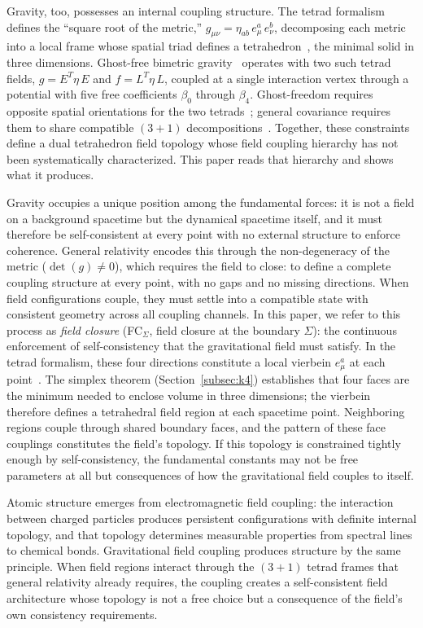 \documentclass[aps,prd,preprint,superscriptaddress,showpacs,preprintnumbers,amsmath,amssymb,nofootinbib]{revtex4-2}
\begin{document}
Gravity, too, possesses an internal coupling structure. The tetrad formalism~\cite{mtw1973,wald1984} defines the ``square root of the metric,'' $g_{\mu\nu} = \eta_{ab}\,e^a_\mu\,e^b_\nu$, decomposing each metric into a local frame whose spatial triad defines a tetrahedron~\cite{barbieri1998}, the minimal solid in three dimensions. Ghost-free bimetric gravity~\cite{hassan2012,hinterbichler2012} operates with two such tetrad fields, $g = E^T\eta\,E$ and $f = L^T\eta\,L$, coupled at a single interaction vertex through a potential with five free coefficients $\beta_0$ through $\beta_4$. Ghost-freedom requires opposite spatial orientations for the two tetrads~\cite{alexander2014}; general covariance requires them to share compatible $(3{+}1)$ decompositions~\cite{hassankocic2018}. Together, these constraints define a dual tetrahedron field topology whose field coupling hierarchy has not been systematically characterized. This paper reads that hierarchy and shows what it produces.

Gravity occupies a unique position among the fundamental forces: it is not a field on a background spacetime but the dynamical spacetime itself, and it must therefore be self-consistent at every point with no external structure to enforce coherence. General relativity encodes this through the non-degeneracy of the metric ($\det(g) \neq 0$), which requires the field to close: to define a complete coupling structure at every point, with no gaps and no missing directions. When field configurations couple, they must settle into a compatible state with consistent geometry across all coupling channels. In this paper, we refer to this process as \emph{field closure} (FC$_{\Sigma}$, field closure at the boundary $\Sigma$): the continuous enforcement of self-consistency that the gravitational field must satisfy. In the tetrad formalism, these four directions constitute a local vierbein $e^a_\mu$ at each point~\cite{mtw1973,wald1984}. The simplex theorem (Section~\ref{subsec:k4}) establishes that four faces are the minimum needed to enclose volume in three dimensions; the vierbein therefore defines a tetrahedral field region at each spacetime point. Neighboring regions couple through shared boundary faces, and the pattern of these face couplings constitutes the field's topology. If this topology is constrained tightly enough by self-consistency, the fundamental constants may not be free parameters at all but consequences of how the gravitational field couples to itself.

Atomic structure emerges from electromagnetic field coupling: the interaction between charged particles produces persistent configurations with definite internal topology, and that topology determines measurable properties from spectral lines to chemical bonds. Gravitational field coupling produces structure by the same principle. When field regions interact through the $(3{+}1)$ tetrad frames that general relativity already requires, the coupling creates a self-consistent field architecture whose topology is not a free choice but a consequence of the field's own consistency requirements.
\end{document}
